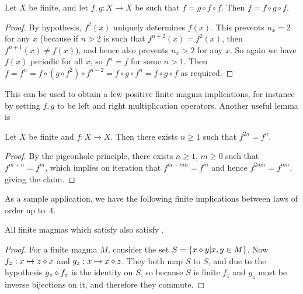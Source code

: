 \begin{lemma}\label{gff}  \leanok Let $X$ be finite, and let $f, g: X \to X$ be such that $f = g \circ f \circ f$.  Then $f = f \circ g \circ f$.
\end{lemma}

\begin{proof} \leanok By hypothesis, $f^2(x)$ uniquely determines $f(x)$.  This prevents $n_x = 2$ for any $x$ (because if $n>2$ is such that $f^{n+2}(x) = f^2(x)$, then $f^{n+1}(x) \neq f(x)$), and hence also prevents $n_x > 2$ for any $x$.   So again we have $f(x)$ periodic for all $x$, so $f^n = f$ for some $n>1$.  Then $f = f^n = f \circ (g \circ f^2) \circ f^{n-2} = f \circ g \circ f^n = f \circ g \circ f$ as required.
\end{proof}

This can be used to obtain a few positive finite magma implications, for instance by setting $f,g$ to be left and right multiplication operators.  Another useful lemma is

\begin{lemma}\label{period}  \leanok  Let $X$ be finite and $f: X \to X$.  Then there exists $n \geq 1$ such that $f^{2n} = f^n$.
\end{lemma}

\begin{proof} \leanok By the pigeonhole principle, there exists $n \geq 1$, $m \geq 0$ such that $f^{m+n} = f^m$, which implies on iteration that $f^{m+mn} = f^m$ and hence $f^{2mn} = f^{mn}$, giving the claim.
\end{proof}

As a sample application, we have the following finite implications between laws of order up to~$4$.

\begin{proposition}\label{finite_imp_3994_3588_thm}
  \leanok
  All finite magmas which satisfy  also satisfy .
\end{proposition}

\begin{proof}\label{finite_imp_3994_3588} \leanok
  For a finite magma $M$, consider the set $S = \{x \diamond y | x, y \in M\}$.
  Now $f_z : x \mapsto z \diamond x$ and $g_z : x \mapsto x \diamond z$.
  They both map $S$ to $S$, and due to the hypothesis $g_z \diamond f_z$ is the identity on $S$,
  so because $S$ is finite $f_z$ and $g_z$ must be inverse bijections on it, and therefore
  they commute.
\end{proof}

